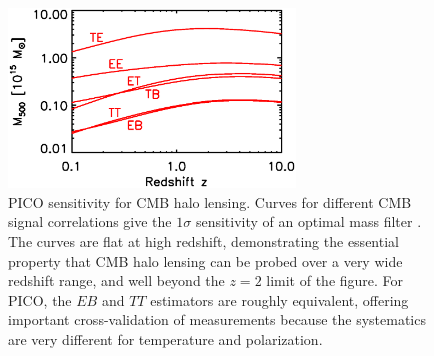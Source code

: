 \documentclass[PICOReport.tex]{subfiles}
\begin{document}
\begin{figure}[t]
\hspace{-0.1in}
\parbox{3.1in}{\centerline {
\includegraphics[width=3.0in]{images/m500lim_vs_z_pico_polar_v3.eps} } }
\hspace{0.in}
\parbox{3.4in}{
\caption{\captiontext 
PICO sensitivity for CMB halo lensing.  Curves for different CMB signal correlations give the $1\sigma$ sensitivity of an optimal mass filter \citep{2015A&A...578A..21M}.  The curves are flat at high redshift, demonstrating the essential property that CMB halo lensing can be probed over a very wide redshift range, and well beyond the $z=2$ limit of the figure.  For PICO, the $EB$ and $TT$ estimators are roughly equivalent, offering important cross-validation of measurements because the systematics are very different for temperature and polarization. 
\label{fig:HaloLensing} 
} }
\vspace{-0.1in}
\end{figure}
\end{document}
